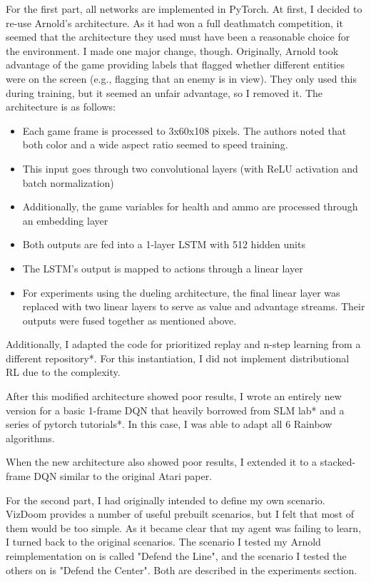\documentclass[letterpaper]{article}
\begin{document}
	For the first part, all networks are implemented in PyTorch. At first, I decided to re-use Arnold's architecture. As it had won a full deathmatch competition, it seemed that the architecture they used must have been a reasonable choice for the environment. I made one major change, though. Originally, Arnold took advantage of the game providing labels that flagged whether different entities were on the screen (e.g., flagging that an enemy is in view). They only used this during training, but it seemed an unfair advantage, so I removed it. The architecture is as follows:
	\begin{itemize}
		\item Each game frame is processed to 3x60x108 pixels. The authors noted that both color and a wide aspect ratio seemed to speed training.
		\item This input goes through two convolutional layers (with ReLU activation and batch normalization)
		\item Additionally, the game variables for health and ammo are processed through an embedding layer
		\item Both outputs are fed into a 1-layer LSTM with 512 hidden units
		\item The LSTM's output is mapped to actions through a linear layer
		\item For experiments using the dueling architecture, the final linear layer was replaced with two linear layers to serve as value and advantage streams. Their outputs were fused together as mentioned above.
	\end{itemize} 

	Additionally, I adapted the code for prioritized replay and n-step learning from a different repository*. For this instantiation, I did not implement distributional RL due to the complexity.
	
	After this modified architecture showed poor results, I wrote an entirely new version for a basic 1-frame DQN that heavily borrowed from SLM lab* and a series of pytorch tutorials*. In this case, I was able to adapt all 6 Rainbow algorithms.
	
	When the new architecture also showed poor results, I extended it to a stacked-frame DQN similar to the original Atari paper. 
	
	For the second part, I had originally intended to define my own scenario. VizDoom provides a number of useful prebuilt scenarios, but I felt that most of them would be too simple. As it became clear that my agent was failing to learn, I turned back to the original scenarios. The scenario I tested my Arnold reimplementation on is called "Defend the Line", and the scenario I tested the others on is "Defend the Center". Both are described in the experiments section.
	
\end{document}
